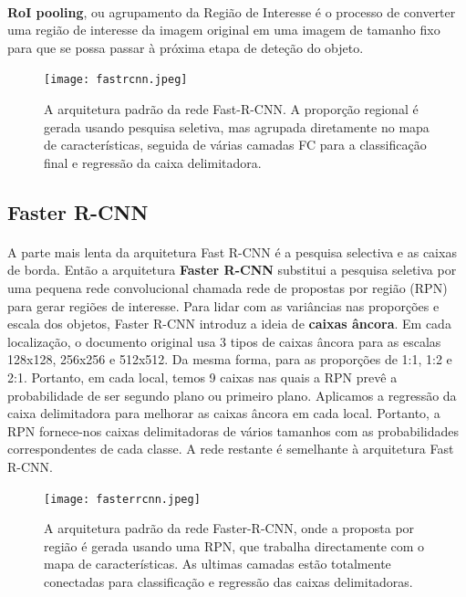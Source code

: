\paragraph{}
\textbf{\ac{RoI} pooling}, ou agrupamento da Região de Interesse é o processo de converter uma região de interesse da imagem original em uma imagem de tamanho fixo para que se possa passar à próxima etapa de deteção do objeto.

\begin{figure}[h!]
  \label{img:fastrcnn}
  \texttt{[image: fastrcnn.jpeg]}
  \caption{A arquitetura padrão da rede Fast-\ac{R-CNN}. A proporção regional é gerada usando pesquisa seletiva, mas agrupada diretamente no mapa de características, seguida de várias camadas FC para a classificação final e regressão da caixa delimitadora.}
\end{figure}

\subsection{Faster R-CNN}
\label{chap2:subsec:fasterrcnn}

\paragraph{}
A parte mais lenta da arquitetura Fast \ac{R-CNN} é a pesquisa selectiva e as caixas de borda. Então a arquitetura \textbf{Faster \ac{R-CNN}} substitui a pesquisa seletiva por uma pequena rede convolucional chamada rede de propostas por região (\ac{RPN}) para gerar regiões de interesse.
\newline Para lidar com as variâncias nas proporções e escala dos objetos, Faster \ac{R-CNN} introduz a ideia de \textbf{caixas âncora}. Em cada localização, o documento original usa 3 tipos de caixas âncora para as escalas 128x128, 256x256 e 512x512. Da mesma forma, para as proporções de 1:1, 1:2 e 2:1. Portanto, em cada local, temos 9 caixas nas quais a \ac{RPN} prevê a probabilidade de ser segundo plano ou primeiro plano. Aplicamos a regressão da caixa delimitadora para melhorar as caixas âncora em cada local. Portanto, a \ac{RPN} fornece-nos caixas delimitadoras de vários tamanhos com as probabilidades correspondentes de cada classe.
A rede restante é semelhante à arquitetura Fast \ac{R-CNN}.

\begin{figure}[h!]
  \label{img:fasterrcnn}
  \texttt{[image: fasterrcnn.jpeg]}
  \caption{A arquitetura padrão da rede Faster-\ac{R-CNN}, onde a proposta por região é gerada usando uma \ac{RPN}, que trabalha directamente com o mapa de características. As ultimas camadas estão totalmente conectadas para classificação e regressão das caixas delimitadoras.}
\end{figure}

